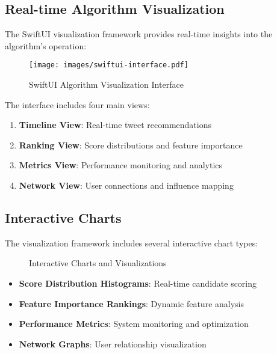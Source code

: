 \documentclass[11pt,a4paper]{article}
\begin{document}
\subsection{Real-time Algorithm Visualization}

The SwiftUI visualization framework provides real-time insights into the algorithm's operation:

\begin{figure}[H]
    \centering
    \texttt{[image: images/swiftui-interface.pdf]}
    \caption{SwiftUI Algorithm Visualization Interface}
    \label{fig:swiftui-interface}
\end{figure}

The interface includes four main views:
\begin{enumerate}
    \item \textbf{Timeline View}: Real-time tweet recommendations
    \item \textbf{Ranking View}: Score distributions and feature importance
    \item \textbf{Metrics View}: Performance monitoring and analytics
    \item \textbf{Network View}: User connections and influence mapping
\end{enumerate}

\subsection{Interactive Charts}

The visualization framework includes several interactive chart types:

\begin{figure}[H]
    \centering
    \caption{Interactive Charts and Visualizations}
    \label{fig:charts}
\end{figure}

\begin{itemize}
    \item \textbf{Score Distribution Histograms}: Real-time candidate scoring
    \item \textbf{Feature Importance Rankings}: Dynamic feature analysis
    \item \textbf{Performance Metrics}: System monitoring and optimization
    \item \textbf{Network Graphs}: User relationship visualization
\end{itemize}
\end{document}

